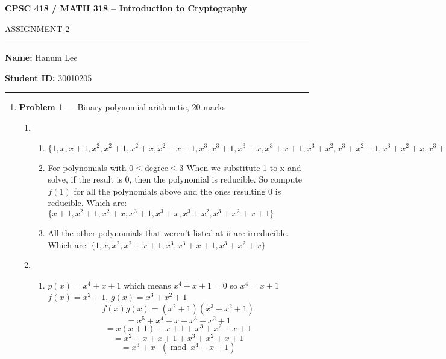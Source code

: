 \documentclass[11pt]{article}
\theoremstyle{definition}
\renewcommand{\pmod}[1]{\mbox{\ $(\ensuremath{\operatorname{mod}}\ {#1})$}}
\begin{document}
\begin{center}
{\bf \Large CPSC 418 / MATH 318 -- Introduction to Cryptography

ASSIGNMENT 2}
\end{center}

\hrule 	

\textbf{Name:} Hanum Lee

\textbf{Student ID:} 30010205

\medskip \hrule

\begin{enumerate}

	\item[] \textbf{Problem 1} ---  Binary polynomial arithmetic, 20 marks
	
	\begin{enumerate}
		\item %
		
		\begin{enumerate}
			\item %
			$\{1,x,x+1,x^{2},x^{2}+1,x^{2}+x,x^{2}+x+1,x^{3},x^{3}+1,x^{3}+x,x^{3}+x+1,x^{3}+x^{2},x^{3}+x^{2}+1,x^{3}+x^{2}+x,x^{3}+x^{2}+x+1 \}$
			
			\item %
			For polynomials with 0$\leq$degree$\leq$3 When we substitute 1 to x and solve, if the result is 0, then the polynomial is reducible. So compute $f(1)$ for all the polynomials above and the ones resulting 0 is reducible. Which are: \newline
			$\{x+1,x^{2}+1,x^{2}+x,x^{3}+1,x^{3}+x,x^{3}+x^{2},x^{3}+x^{2}+x+1\}$
			
			\item %
			All the other polynomials that weren't listed at ii are irreducible. Which are: \newline
			$\{1,x,x^{2},x^{2}+x+1,x^{3},x^{3}+x+1,x^{3}+x^{2}+x\}$
		
		\end{enumerate}
	
		\item %
			
		\begin{enumerate}
			\item %
			$p(x) = x^{4}+x+1$ which means $x^{4}+x+1 = 0$ so $x^4=x+1$\newline
			$f(x) = x^{2}+1$,  $g(x) = x^{3}+x^{2}+1$	\newline
			\[f(x)g(x) = (x^2+1)(x^{3}+x^{2}+1)\]
			\[= x^5 + x^4 + x + x^3 + x^2 + 1\]
			\[= x(x+1) + x+1 + x^3 + x^2 + x + 1\]
			\[= x^2 + x + x + 1 + x^3 + x^2 + x + 1\]
			\[=x^3+x \pmod{x^4+x+1} \]
			

\end{enumerate}
\end{enumerate}
\end{enumerate}
\end{document}
